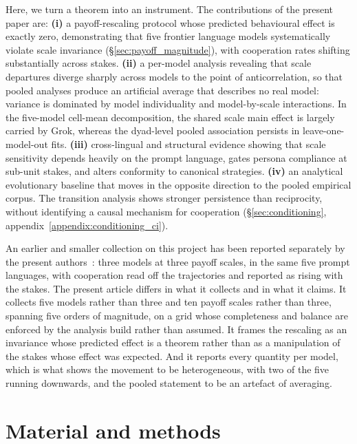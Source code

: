 \documentclass[11pt,a4paper]{article}
\begin{document}
Here, we turn a theorem into an instrument. The contributions of the present
paper are: \textbf{(i)} a payoff-rescaling protocol whose predicted behavioural
effect is exactly zero, demonstrating that five frontier language models
systematically violate scale invariance (\S\ref{sec:payoff_magnitude}), with
cooperation rates shifting substantially across stakes. \textbf{(ii)} a
per-model analysis revealing that scale departures diverge sharply across
models to the point of anticorrelation, so that pooled analyses produce
an artificial average that describes no real model: variance is dominated by
model individuality and model-by-scale interactions. In the five-model
cell-mean decomposition, the shared scale main effect is largely carried by
Grok, whereas the dyad-level pooled association persists in leave-one-model-out
fits. \textbf{(iii)} cross-lingual and structural evidence showing that scale
sensitivity depends heavily on the prompt language, gates persona compliance
at sub-unit stakes, and alters conformity to canonical strategies.
\textbf{(iv)} an analytical evolutionary baseline that moves in the
opposite direction to the pooled empirical corpus. The transition analysis
shows stronger persistence than reciprocity, without identifying a causal
mechanism for cooperation (\S\ref{sec:conditioning}, appendix~\ref{appendix:conditioning_ci}).

An earlier and smaller collection on this project has been reported separately
by the present authors~\cite{selfpreprint2026scaling}: three models at three
payoff scales, in the same five prompt languages, with cooperation read off the
trajectories and reported as rising with the stakes. The present article
differs in what it collects and in what it claims. It collects five models
rather than three and ten payoff scales rather than three, spanning five orders
of magnitude, on a grid whose completeness and balance are enforced by the
analysis build rather than assumed. It frames the rescaling as an invariance
whose predicted effect is a theorem rather than as a manipulation of the stakes
whose effect was expected. And it reports every quantity per model, which is
what shows the movement to be heterogeneous, with two of the five running
downwards, and the pooled statement to be an artefact of averaging.


\section{Material and methods}\label{sec:methodology}
\end{document}

